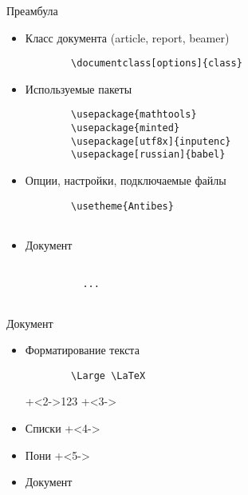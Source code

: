 \begin{frame}[fragile]{Преамбула}
  \begin{itemize}
    \item Класс документа (article, report, beamer)
      \begin{verbatim}
        \documentclass[options]{class}
      \end{verbatim}
    \pause  
    \item Используемые пакеты 
      \begin{verbatim}
        \usepackage{mathtools}
        \usepackage{minted}
        \usepackage[utf8x]{inputenc}
        \usepackage[russian]{babel}
      \end{verbatim}
    \pause  
    \item Опции, настройки, подключаемые файлы
      \begin{verbatim}
        \usetheme{Antibes}
        
      \end{verbatim}
    \pause  
    \item Документ
      \begin{verbatim}
        
          ...
        
      \end{verbatim}
  \end{itemize}
\end{frame}

\begin{frame}[fragile]{Документ}

  \begin{itemize}
    \item Форматирование текста
      \begin{verbatim}
        \Large \LaTeX
      \end{verbatim}
      \onslide+<2->{123}
    \onslide+<3->
    \item Списки
    \onslide+<4->
    \item Пони
    \onslide+<5->
    \item Документ
  \end{itemize}

\end{frame}

